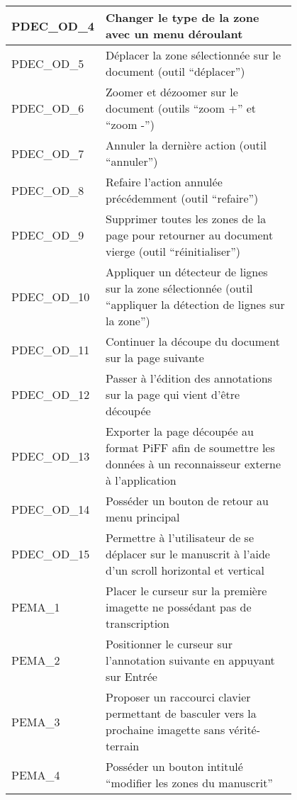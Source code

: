 \begin{center}
\begin{tabular}{ | l | p{0.8\linewidth} | }
        \hline
        \rowcolor{red!30}PDEC\_OD\_4 & Changer le type de la zone avec un menu déroulant \\
        \hline
        \rowcolor{red!30}PDEC\_OD\_5 & Déplacer la zone sélectionnée sur le document (outil “déplacer”) \\
        \hline
        \rowcolor{red!30}PDEC\_OD\_6 & Zoomer et dézoomer sur le document (outils “zoom +” et “zoom -”) \\
        \hline
        \rowcolor{red!30}PDEC\_OD\_7 & Annuler la dernière action (outil “annuler”) \\
        \hline
        \rowcolor{red!30}PDEC\_OD\_8 & Refaire l’action annulée précédemment (outil “refaire”) \\
        \hline
        \rowcolor{red!30}PDEC\_OD\_9 & Supprimer toutes les zones de la page pour retourner au document vierge (outil “réinitialiser”) \\
        \hline
        \rowcolor{red!30}PDEC\_OD\_10 & Appliquer un détecteur de lignes sur la zone sélectionnée (outil “appliquer la détection de lignes sur la zone”) \\
        \hline
        \rowcolor{red!30}PDEC\_OD\_11 & Continuer la découpe du document sur la page suivante \\
        \hline
        \rowcolor{red!30}PDEC\_OD\_12 & Passer à l’édition des annotations sur la page qui vient d'être découpée \\
        \hline
        \rowcolor{red!30}PDEC\_OD\_13 & Exporter la page découpée au format PiFF afin de soumettre les données à un reconnaisseur externe à l’application \\
        \hline
        \rowcolor{red!30}PDEC\_OD\_14 & Posséder un bouton de retour au menu principal \\
        \hline
        \rowcolor{red!30}PDEC\_OD\_15 & Permettre à l’utilisateur de se déplacer sur le manuscrit à l’aide d’un scroll horizontal et vertical \\
        \hline
        PEMA\_1 & Placer le curseur sur la première imagette ne possédant pas de transcription \\
        \hline
        PEMA\_2 & Positionner le curseur sur l’annotation suivante en appuyant sur Entrée \\
        \hline
        PEMA\_3 & Proposer un raccourci clavier permettant de basculer vers la prochaine imagette sans vérité-terrain \\
        \hline
        \rowcolor{red!30}PEMA\_4 & Posséder un bouton intitulé “modifier les zones du manuscrit” \\

\end{tabular}
\end{center}
